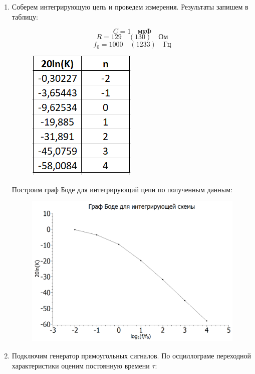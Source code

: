 \documentclass[a4paper, 12pt]{article}%
\begin{document}
\begin{enumerate}

\item Соберем интегрирующую цепь и проведем измерения. Результаты запишем в таблицу:

\[C = 1 \quad \textit{мкФ}\]
\[R = 129 \quad (130) \quad \textit{Ом}\]
\[f_0 = 1000 \quad (1233) \quad \textit{Гц} \]

\begin{figure}[h!]
\centering
\includegraphics[scale=1]{table1.png}
\label{fig:Image1}
\end{figure}

Построим граф Боде для интегрирующий цепи по полученным данным:

\begin{figure}[h!]
\centering
\includegraphics[scale=0.5]{graph1.png}
\label{fig:Image1}
\end{figure}

\item Подключим генератор прямоугольных сигналов. По осциллограме переходной характеристики оценим постоянную времени $\tau$:


\end{enumerate}
\end{document}
